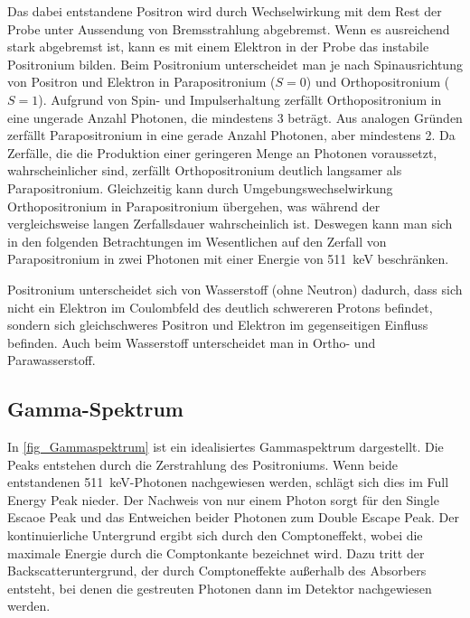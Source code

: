 \documentclass[
	a4paper,
	12pt,
	pagesize,
	ngerman
]{scrartcl}
\begin{document}
	Das dabei entstandene Positron wird durch Wechselwirkung mit dem Rest der Probe unter Aussendung von Bremsstrahlung abgebremst.
	Wenn es ausreichend stark abgebremst ist, kann es mit einem Elektron in der Probe das instabile Positronium bilden.
	Beim Positronium unterscheidet man je nach Spinausrichtung von Positron und Elektron in Parapositronium ($S=0$) und Orthopositronium ($S=1$).
	Aufgrund von Spin- und Impulserhaltung zerfällt Orthopositronium in eine ungerade Anzahl Photonen, die mindestens \num{3} beträgt.
	Aus analogen Gründen zerfällt Parapositronium in eine gerade Anzahl Photonen, aber mindestens \num{2}.
	Da Zerfälle, die die Produktion einer geringeren Menge an Photonen voraussetzt, wahrscheinlicher sind, zerfällt Orthopositronium deutlich langsamer als Parapositronium.
	Gleichzeitig kann durch Umgebungswechselwirkung Orthopositronium in Parapositronium übergehen, was während der vergleichsweise langen Zerfallsdauer wahrscheinlich ist.
	Deswegen kann man sich in den folgenden Betrachtungen im Wesentlichen auf den Zerfall von Parapositronium in zwei Photonen mit einer Energie von \SI{511}{keV} beschränken.

	Positronium unterscheidet sich von Wasserstoff (ohne Neutron) dadurch, dass sich nicht ein Elektron im Coulombfeld des deutlich schwereren Protons befindet, sondern sich gleichschweres Positron und Elektron im gegenseitigen Einfluss befinden.
	Auch beim Wasserstoff unterscheidet man in Ortho- und Parawasserstoff.

	\subsection{Gamma-Spektrum}

		In \cref{fig_Gammaspektrum} ist ein idealisiertes Gammaspektrum dargestellt.
		Die Peaks entstehen durch die Zerstrahlung des Positroniums.
		Wenn beide entstandenen \SI{511}{keV}-Photonen nachgewiesen werden, schlägt sich dies im Full Energy Peak nieder. %
		Der Nachweis von nur einem Photon sorgt für den Single Escaoe Peak und das Entweichen beider Photonen zum Double Escape Peak.
		Der kontinuierliche Untergrund ergibt sich durch den Comptoneffekt, wobei die maximale Energie durch die Comptonkante bezeichnet wird.
		Dazu tritt der Backscatteruntergrund, der durch Comptoneffekte außerhalb des Absorbers entsteht, bei denen die gestreuten Photonen dann im Detektor nachgewiesen werden.
\end{document}
